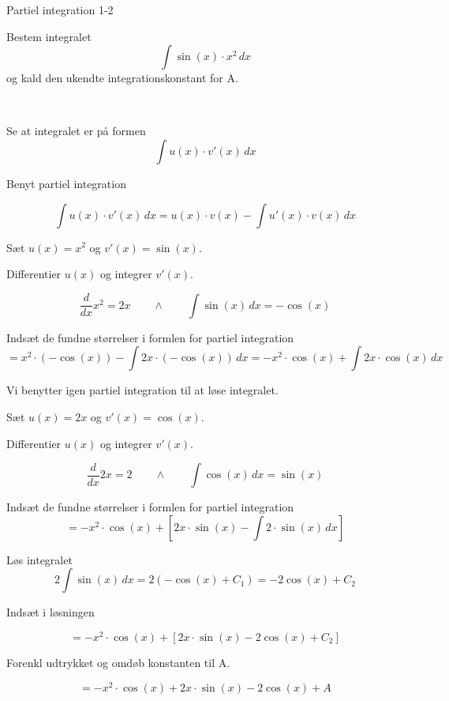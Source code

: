 \documentclass{article}
\begin{document}
\begin{exercise}{Partiel integration 1-2}
	
	
	Bestem integralet
	\[
	\int \sin(x) \cdot x^2 \, dx
	\]
	og kald den ukendte integrationskonstant for A.
	
	 \\
	
	
	\hint
	
	Se at integralet er på formen
	\[
	\int u(x) \cdot v'(x) \, dx
	\]
	
	\hint
	
	Benyt partiel integration
	
	\hint
	\[
	\int u(x) \cdot v'(x)\, dx = u(x) \cdot v(x) - \int u'(x) \cdot v(x) \, dx
	\]
	\hint
	
	Sæt $u(x) = x^2$ og $v'(x) = \sin(x)$.
	
	
	\hint
	
	Differentier $u(x)$ og integrer $v'(x)$.
	
	\hint
	\[
	\frac{d}{dx}x^2 = 2x \qquad \wedge \qquad \int \sin(x) \, dx = -\cos(x)
	\]
	
	\hint
	
	Indsæt de fundne størrelser i formlen for partiel integration
	\[
	= x^2 \cdot (-\cos(x)) - \int 2x \cdot (-\cos(x)) \, dx = -x^2 \cdot \cos(x) + \int 2x \cdot \cos(x) \, dx 
	\]
	
	\hint
	
	Vi benytter igen partiel integration til at løse integralet.
	
	\hint
	
	Sæt $u(x) = 2x$ og $v'(x) = \cos(x)$.
	
	
	\hint
	
	Differentier $u(x)$ og integrer $v'(x)$.
	
	\hint
	\[
	\frac{d}{dx}2x = 2 \qquad \wedge \qquad \int \cos(x) \, dx = \sin(x)
	\]
	
	\hint
	
	Indsæt de fundne størrelser i formlen for partiel integration
	\[
	= -x^2 \cdot \cos(x) + \left[ 2x \cdot \sin(x) - \int 2 \cdot \sin(x) \, dx \right]
	\]
	
	\hint
	Løs integralet
	\[
	2 \int \sin(x) \, dx = 2 (-\cos(x) + C_1) = -2\cos(x) + C_2
	\]
	
	\hint
	Indsæt i løsningen 
	
	\hint
	
	\[
	= -x^2 \cdot \cos(x) + \left[ 2x \cdot \sin(x) - 2\cos(x) + C_2 \right]
	\]
	
	\hint
	
	Forenkl udtrykket og omdøb konstanten til A.
	
	\hint
	
	\[
	= -x^2 \cdot \cos(x) + 2x \cdot \sin(x) - 2\cos(x) + A
	\]
	
	
\end{exercise}
\end{document}
